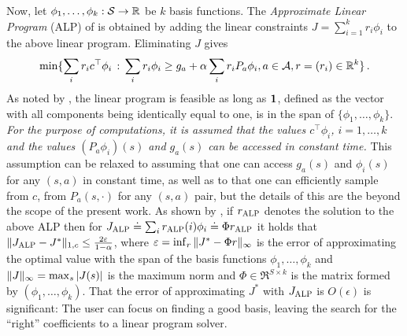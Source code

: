 \documentclass[12pt,draftcls,onecolumn]{IEEEtran}
\begin{document}
Now, let $\phi_1,\ldots,\phi_k : \S \to \Re$ be $k$ basis functions.
The \emph{Approximate Linear Program} (ALP) of \citet{SchSei85}
is obtained by adding the linear constraints $J = \sum_{i=1}^k r_i \phi_i$ to the above linear program. Eliminating $J$ gives \begin{align*}
\min\{ \sum_i r_i c^\top \phi_i \,:\, \sum_i r_i \phi_i \ge g_a + \alpha \sum_i r_i P_a \phi_i, a\in \A, r = (r_i)\in \Re^k \}\,.
\end{align*}
As noted by \citet{SchSei85}, the linear program is feasible as long as $\one$, defined as the vector with all components being identically equal to one, is in the span of $\{\phi_1,\dots,\phi_k\}$.
\emph{For the purpose of computations, it is assumed that the values $c^\top \phi_i$, $i=1,\dots, k$ and the values $(P_a \phi_i)(s)$ and $g_a(s)$ can be accessed in constant time.}
This assumption can be relaxed to assuming that one can access $g_a(s)$ and $\phi_i(s)$ for any $(s,a)$ in constant time, as well as to that one can efficiently sample from $c$, from $P_a(s,\cdot)$ for any $(s,a)$ pair,
but the details of this are the beyond the scope of the present work. As shown by \citet{ALP}, if $\ralp$ denotes the solution to the above ALP then for $\Jalp \doteq \sum_i \ralp(i) \phi_i \doteq \Phi \ralp$ it holds that $\norm{\Jalp - J^*}_{1,c} \le \frac{2 \epsilon}{1-\alpha}$, where $\epsilon = \inf_r \norm{ J^* - \Phi r }_\infty$ is the error of approximating the optimal value with the span of the basis functions $\phi_1,\dots,\phi_k$ and $\norm{J}_\infty = \max_s |J(s)|$ is the maximum norm and $\Phi \in \Re^{S\times k}$ is the matrix formed by $(\phi_1,\dots,\phi_k)$. That the error of approximating $J^*$ with $\Jalp$ is $O(\epsilon)$ is significant: The user can focus on finding a good basis, leaving the search for the ``right'' coefficients to a linear program solver.
\end{document}
